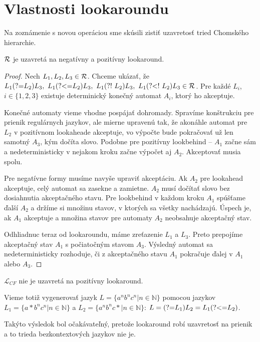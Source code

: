 \documentclass{svk_long_sk}
\def\R{{\cal R}} %
\def\L{\mathscr{L}} %
\def\N{\mathds{N}} %
\def\lookahead{\text{(?=}}
\def\nlookahead{\text{(?!~}}
\def\lookbehind{\text{(?\textless =}}
\def\nlookbehind{\text{(?\textless !~}}
\begin{document}
\section{Vlastnosti lookaroundu}
Na zoznámenie s novou operáciou sme skúsili zistiť uzavretosť tried Chomského hierarchie.
\begin{theorem}\label{R_uz_lalb}
$\R$ je uzavretá na negatívny a pozitívny lookaround.
\end{theorem}
\begin{proof}
Nech $L_1,L_2,L_3\in\R$. Chceme ukázať, že $L_1\lookahead L_2)L_3,~ L_1\lookbehind L_2)L_3,~ L_1\nlookahead L_2)L_3,~ L_1\nlookbehind L_2)L_3 \in \R$. Pre každé $L_i$, $i \in \lbrace 1,2,3\rbrace$ existuje determinický konečný automat $A_i$, ktorý ho akceptuje.

Konečné automaty vieme vhodne pospájať dohromady. Spravíme konštrukciu pre prienik regulárnych jazykov, ale mierne upravenú tak, že akonáhle automat pre $L_2$ v pozitívnom lookaheade akceptuje, vo výpočte bude pokračovať už len samotný $A_3$, kým dočíta slovo. Podobne pre pozitívny lookbehind -- $A_1$ začne sám a nedeterministicky v nejakom kroku začne výpočet aj $A_2$. Akceptovať musia spolu.

Pre negatívne formy musíme navyše upraviť akceptáciu. Ak $A_2$ pre lookahead akceptuje, celý automat sa zasekne a zamietne. $A_2$ musí dočítať slovo bez dosiahnutia akceptačného stavu. Pre lookbehind v každom kroku $A_1$ spúšťame ďalší $A_2$ a držíme si množinu stavov, v ktorých sa všetky nachádzajú. Úspech je, ak $A_1$ akceptuje a množina stavov pre automaty $A_2$ neobsahuje akceptačný stav.

Odhliadnuc teraz od lookaroundu, máme zreťazenie $L_1$ a $L_3$. Preto prepojíme akceptačný stav $A_1$ s počiatočným stavom $A_3$. Výsledný automat sa nedeterministicky rozhoduje, či z akceptačného stavu $A_1$ pokračuje ďalej v $A_1$ alebo $A_3$.
\end{proof}

\begin{theorem}
$\L_{CF}$ nie je uzavretá na pozitívny lookaround.
\end{theorem}
Vieme totiž vygenerovať jazyk $L=\lbrace a^nb^nc^n|n\in\N\rbrace$ pomocou jazykov $L_1=\lbrace a*b^nc^n|n\in\N\rbrace$ a $L_2=\lbrace a^nb^nc*|n\in\N\rbrace$: $L=\lookahead L_1)L_2 =L_1\lookbehind L_2)$.

Takýto výsledok bol očakávateľný, pretože lookaround robí uzavretosť na prienik a to trieda bezkontextových jazykov nie je.
\end{document}
